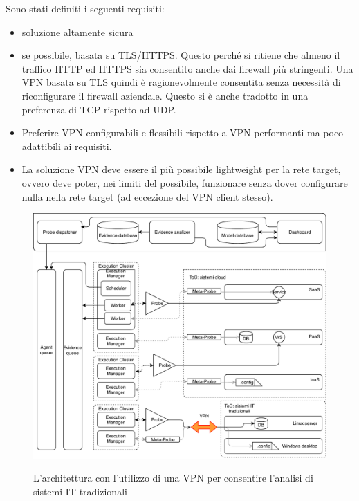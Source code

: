 Sono stati definiti i seguenti requisiti:
\begin{itemize}
	\item soluzione altamente sicura
	\item se possibile, basata su TLS/HTTPS. Questo perché si ritiene che
	      almeno il traffico HTTP ed HTTPS sia consentito anche dai firewall
	      più stringenti. Una VPN basata su TLS quindi è ragionevolmente consentita
	      senza necessità di riconfigurare il firewall aziendale.
	      Questo si è anche tradotto in una preferenza di TCP rispetto ad UDP.
	\item Preferire VPN configurabili e flessibili rispetto a
	      VPN performanti ma poco adattibili ai requisiti.
	\item La soluzione VPN deve essere il più possibile lightweight
	      per la rete target, ovvero deve poter, nei limiti del
	      possibile, funzionare senza dover configurare nulla nella rete
	      target (ad eccezione del VPN client stesso).
\end{itemize}

\begin{figure}
	\includegraphics[scale=0.6]{img/mooncloud_archi_extended}
	\label{fig:mooncloud-archi-extended}
	\caption[L'architettura di MoonCloud estesa con VPN]
	{L'architettura con l'utilizzo di una VPN per
	consentire l'analisi di sistemi IT tradizionali}
\end{figure}